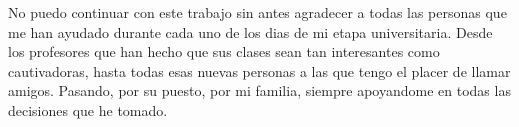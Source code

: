 No puedo continuar con este trabajo sin antes agradecer a todas las personas que me han ayudado durante cada uno de los dias de mi etapa universitaria.
Desde los profesores que han hecho que sus clases sean tan interesantes como cautivadoras, hasta todas esas nuevas personas a las que tengo el placer de llamar amigos. Pasando, por su puesto, por mi familia, siempre apoyandome en todas las decisiones que he tomado.
